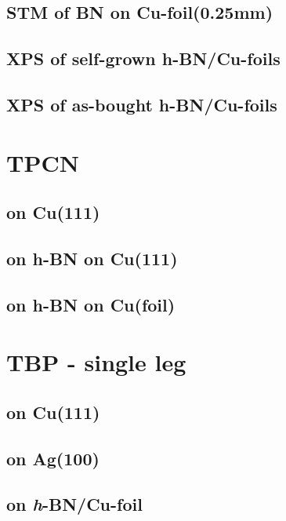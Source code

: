 \documentclass[10pt,a4paper,twoside
,BCOR=8mm				%
,headings=normal		%
,headsepline			%
,footsepline			%
]{scrbook}
\begin{document}
  \section{STM of BN on Cu-foil(0.25mm)}
     
  \section{XPS of self-grown h-BN/Cu-foils}
     
  \section{XPS of as-bought h-BN/Cu-foils}
     
\chapter{TPCN}
    \section{on Cu(111)}
       
    \section{on h-BN on Cu(111)}
       
    \section{on h-BN on Cu(foil)}
       
\chapter{TBP - single leg}
   
   \section{on Cu(111)}
      
   \section{on Ag(100)}
      
   \section{on \textit{h}-BN/Cu-foil}
      
\end{document}
